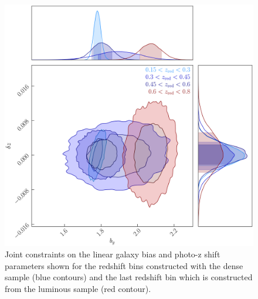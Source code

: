 \documentclass{aa}
\numberwithin{equation}{section}
\begin{document}
\begin{figure}
\includegraphics[width=\columnwidth]{figures_tmp/joint_estimate.png}
\caption{ Joint constraints on the linear galaxy bias and photo-z shift parameters shown for the redshift bins constructed with the dense sample (blue contours) and the last redshift bin which is constructed from the luminous sample (red contour).} 
\label{fig:joint_estimate}
\end{figure}
\end{document}
